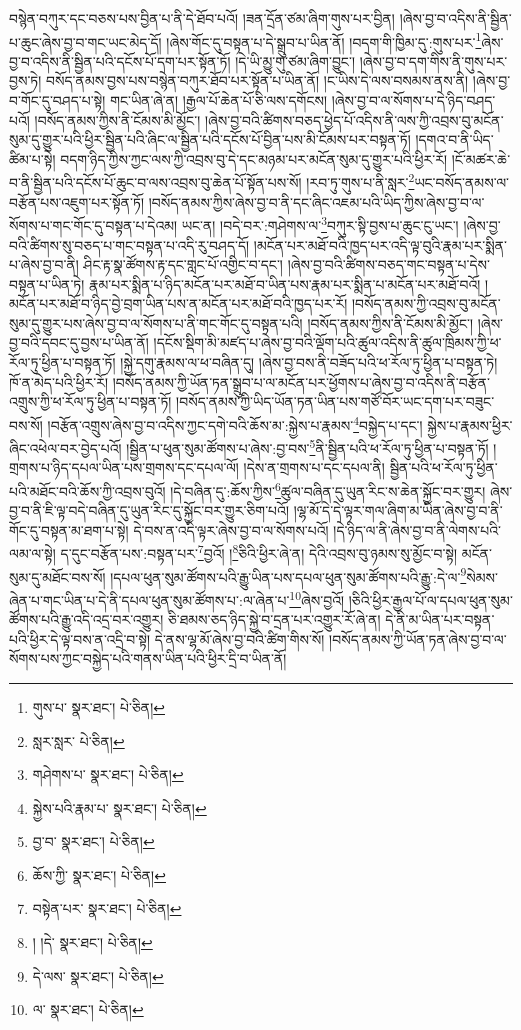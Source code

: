 བསྙེན་བཀུར་དང་བཅས་པས་བྱིན་པ་ནི་དེ་ཐོབ་པའོ། །ཟན་དྲོན་ཙམ་ཞིག་གུས་པར་བྱིན། །ཞེས་བྱ་བ་འདིས་ནི་སྦྱིན་པ་ཆུང་ཞེས་བྱ་བ་གང་ཡང་མེད་དོ། །ཞེས་གོང་དུ་བསྟན་པ་དེ་སྒྲུབ་པ་ཡིན་ནོ། །བདག་གི་ཁྱིམ་དུ་:གུས་པར་\footnote{གུས་པ་  སྣར་ཐང་།  པེ་ཅིན། }ཞེས་བྱ་བ་འདིས་ནི་སྦྱིན་པའི་དངོས་པོ་དག་པར་སྟོན་ཏོ། །དེ་ཡི་མྱུ་གུ་ཙམ་ཞིག་བྱུང་། །ཞེས་བྱ་བ་དག་གིས་ནི་གུས་པར་བྱས་ཏེ། བསོད་ནམས་བྱས་པས་བསྙེན་བཀུར་ཐོབ་པར་སྟོན་པ་ཡིན་ནོ། །ང་ཡིས་དེ་ལས་བསམས་ནས་ནི། །ཞེས་བྱ་བ་གོང་དུ་བཤད་པ་སྟེ། གང་ཡིན་ཞེ་ན། །རྒྱལ་པོ་ཆེན་པོ་ཅི་ལས་དགོངས། །ཞེས་བྱ་བ་ལ་སོགས་པ་དེ་ཉིད་བཤད་པའོ། །བསོད་ནམས་ཀྱིས་ནི་ངོམས་མི་མྱོང་། །ཞེས་བྱ་བའི་ཚིགས་བཅད་ཕྱེད་པོ་འདིས་ནི་ལས་ཀྱི་འབྲས་བུ་མངོན་སུམ་དུ་གྱུར་པའི་ཕྱིར་སྦྱིན་པའི་ཞིང་ལ་སྦྱིན་པའི་དངོས་པོ་བྱིན་པས་མི་ངོམས་པར་བསྟན་ཏོ། །དགའ་བ་ནི་ཡིད་ཚིམ་པ་སྟེ། བདག་ཉིད་ཀྱིས་ཀྱང་ལས་ཀྱི་འབྲས་བུ་དེ་དང་མཉམ་པར་མངོན་སུམ་དུ་གྱུར་པའི་ཕྱིར་རོ། །ངོ་མཚར་ཆེ་བ་ནི་སྦྱིན་པའི་དངོས་པོ་ཆུང་བ་ལས་འབྲས་བུ་ཆེན་པོ་སྟོན་པས་སོ། །རབ་ཏུ་གུས་པ་ནི་སླར་\footnote{སླར་སླར་  པེ་ཅིན། }ཡང་བསོད་ནམས་ལ་བརྩོན་པས་འཇུག་པར་སྟོན་ཏོ། །བསོད་ནམས་ཀྱིས་ཞེས་བྱ་བ་ནི་དང་ཞིང་འཇམ་པའི་ཡིད་ཀྱིས་ཞེས་བྱ་བ་ལ་སོགས་པ་གང་གོང་དུ་བསྟན་པ་དེའམ། ཡང་ན། །བདེ་བར་:གཤེགས་ལ་\footnote{གཤེགས་པ་  སྣར་ཐང་།  པེ་ཅིན། }བཀུར་སྟི་བྱས་པ་ཆུང་ངུ་ཡང་། །ཞེས་བྱ་བའི་ཚིགས་སུ་བཅད་པ་གང་བསྟན་པ་འདི་རུ་བཤད་དོ། །མངོན་པར་མཐོ་བའི་ཁྱད་པར་འདི་ལྟ་བུའི་རྣམ་པར་སྨིན་པ་ཞེས་བྱ་བ་ནི། ཤིང་རྟ་སྣ་ཚོགས་རྟ་དང་གླང་པོ་འགྱིང་བ་དང་། །ཞེས་བྱ་བའི་ཚིགས་བཅད་གང་བསྟན་པ་དེས་བསྟན་པ་ཡིན་ཏེ། རྣམ་པར་སྨིན་པ་ཉིད་མངོན་པར་མཐོ་བ་ཡིན་པས་རྣམ་པར་སྨིན་པ་མངོན་པར་མཐོ་བའོ། །མངོན་པར་མཐོ་བ་ཉིད་བྱེ་བྲག་ཡིན་པས་ན་མངོན་པར་མཐོ་བའི་ཁྱད་པར་རོ། །བསོད་ནམས་ཀྱི་འབྲས་བུ་མངོན་སུམ་དུ་གྱུར་པས་ཞེས་བྱ་བ་ལ་སོགས་པ་ནི་གང་གོང་དུ་བསྟན་པའི། །བསོད་ནམས་ཀྱིས་ནི་ངོམས་མི་མྱོང་། །ཞེས་བྱ་བའི་དབང་དུ་བྱས་པ་ཡིན་ནོ། །དངོས་སྡིག་མི་མཛད་པ་ཞེས་བྱ་བའི་ལྡོག་པའི་ཚུལ་འདིས་ནི་ཚུལ་ཁྲིམས་ཀྱི་ཕ་རོལ་ཏུ་ཕྱིན་པ་བསྟན་ཏོ། །སྐྱེ་དགུ་རྣམས་ལ་ཕ་བཞིན་དུ། །ཞེས་བྱ་བས་ནི་བཟོད་པའི་ཕ་རོལ་ཏུ་ཕྱིན་པ་བསྟན་ཏེ། ཁོ་ན་མེད་པའི་ཕྱིར་རོ། །བསོད་ནམས་ཀྱི་ཡོན་ཏན་སྒྲུབ་པ་ལ་མངོན་པར་ཕྱོགས་པ་ཞེས་བྱ་བ་འདིས་ནི་བརྩོན་འགྲུས་ཀྱི་ཕ་རོལ་ཏུ་ཕྱིན་པ་བསྟན་ཏོ། །བསོད་ནམས་ཀྱི་ཡིད་ཡོན་ཏན་ཡིན་པས་གཙོ་བོར་ཡང་དག་པར་བཟུང་བས་སོ། །བརྩོན་འགྲུས་ཞེས་བྱ་བ་འདིས་ཀྱང་དགེ་བའི་ཆོས་མ་:སྐྱེས་པ་རྣམས་\footnote{སྐྱེས་པའི་རྣམ་པ་  སྣར་ཐང་།  པེ་ཅིན། }བསྐྱེད་པ་དང་། སྐྱེས་པ་རྣམས་ཕྱིར་ཞིང་འཕེལ་བར་བྱེད་པའོ། །སྦྱིན་པ་ཕུན་སུམ་ཚོགས་པ་ཞེས་:བྱ་བས་\footnote{བྱ་བ་  སྣར་ཐང་།  པེ་ཅིན། }ནི་སྦྱིན་པའི་ཕ་རོལ་ཏུ་ཕྱིན་པ་བསྟན་ཏོ། །གྲགས་པ་ཉིད་དཔལ་ཡིན་པས་གྲགས་དང་དཔལ་ལོ། །དེས་ན་གྲགས་པ་དང་དཔལ་ནི། སྦྱིན་པའི་ཕ་རོལ་ཏུ་ཕྱིན་པའི་མཐོང་བའི་ཆོས་ཀྱི་འབྲས་བུའོ། །དེ་བཞིན་དུ་:ཆོས་ཀྱིས་\footnote{ཆོས་ཀྱི་  སྣར་ཐང་།  པེ་ཅིན། }ཚུལ་བཞིན་དུ་ཡུན་རིང་ས་ཆེན་སྐྱོང་བར་གྱུར། ཞེས་བྱ་བ་ནི་ཇི་ལྟ་བདེ་བཞིན་དུ་ཡུན་རིང་དུ་སྐྱོང་བར་གྱུར་ཅིག་པའོ། །ལྷ་མོ་དེ་དེ་ལྟར་གལ་ཞིག་མ་ཡིན་ཞེས་བྱ་བ་ནི་གོང་དུ་བསྟན་མ་ཐག་པ་སྟེ། དེ་བས་ན་འདི་ལྟར་ཞེས་བྱ་བ་ལ་སོགས་པའོ། །དེ་ཉིད་ལ་ནི་ཞེས་བྱ་བ་ནི་ལེགས་པའི་ལམ་ལ་སྟེ། ད་དུང་བརྩོན་པས་:བསྟན་པར་\footnote{བསྟེན་པར་  སྣར་ཐང་།  པེ་ཅིན། }བྱའོ། །\footnote{། །དེ་  སྣར་ཐང་།  པེ་ཅིན། }ཅིའི་ཕྱིར་ཞེ་ན། དེའི་འབྲས་བུ་ཉམས་སུ་མྱོང་བ་སྟེ། མངོན་སུམ་དུ་མཐོང་བས་སོ། །དཔལ་ཕུན་སུམ་ཚོགས་པའི་རྒྱུ་ཡིན་པས་དཔལ་ཕུན་སུམ་ཚོགས་པའི་རྒྱུ་:དེ་ལ་\footnote{དེ་ལས་  སྣར་ཐང་།  པེ་ཅིན། }སེམས་ཞེན་པ་གང་ཡིན་པ་དེ་ནི་དཔལ་ཕུན་སུམ་ཚོགས་པ་:ལ་ཞེན་པ་\footnote{ལ་  སྣར་ཐང་།  པེ་ཅིན། }ཞེས་བྱའོ། །ཅིའི་ཕྱིར་རྒྱལ་པོ་ལ་དཔལ་ཕུན་སུམ་ཚོགས་པའི་རྒྱུ་འདི་འདྲ་བར་འགྱུར། ཅི་ཐམས་ཅད་ཉིད་སྐྱེ་བ་དྲན་པར་འགྱུར་རོ་ཞེ་ན། དེ་ནི་མ་ཡིན་པར་བསྟན་པའི་ཕྱིར་དེ་ལྟ་བས་ན་འདྲི་བ་སྟེ། དེ་ནས་ལྷ་མོ་ཞེས་བྱ་བའི་ཚིག་གིས་སོ། །བསོད་ནམས་ཀྱི་ཡོན་ཏན་ཞེས་བྱ་བ་ལ་སོགས་པས་ཀྱང་བསྐྱེད་པའི་གནས་ཡིན་པའི་ཕྱིར་དྲི་བ་ཡིན་ནོ། 